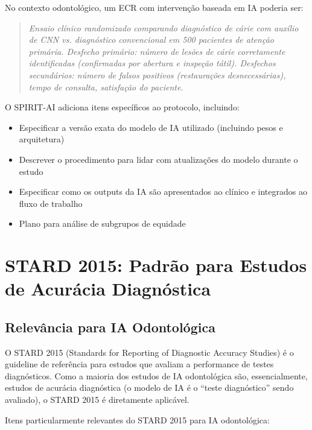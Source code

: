 No contexto odontológico, um ECR com intervenção baseada em IA poderia ser:

\begin{quote}
\textit{Ensaio clínico randomizado comparando diagnóstico de cárie com auxílio de CNN vs. diagnóstico convencional em 500 pacientes de atenção primária. Desfecho primário: número de lesões de cárie corretamente identificadas (confirmadas por abertura e inspeção tátil). Desfechos secundários: número de falsos positivos (restaurações desnecessárias), tempo de consulta, satisfação do paciente.}
\end{quote}

O SPIRIT-AI adiciona itens específicos ao protocolo, incluindo:
\begin{itemize}
    \item Especificar a versão exata do modelo de IA utilizado (incluindo pesos e arquitetura)
    \item Descrever o procedimento para lidar com atualizações do modelo durante o estudo
    \item Especificar como os outputs da IA são apresentados ao clínico e integrados ao fluxo de trabalho
    \item Plano para análise de subgrupos de equidade
\end{itemize}

\section{STARD 2015: Padrão para Estudos de Acurácia Diagnóstica}

\subsection{Relevância para IA Odontológica}

O STARD 2015 (Standards for Reporting of Diagnostic Accuracy Studies)  é o guideline de referência para estudos que avaliam a performance de testes diagnósticos. Como a maioria dos estudos de IA odontológica são, essencialmente, estudos de acurácia diagnóstica (o modelo de IA é o ``teste diagnóstico'' sendo avaliado), o STARD 2015 é diretamente aplicável.

Itens particularmente relevantes do STARD 2015 para IA odontológica:

